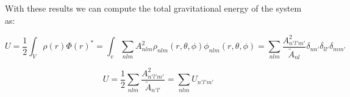 \documentclass[14pt]{article}
\begin{document}
With these results we can compute the total gravitational energy of the system
as:

\begin{equation}
  U = \dfrac{1}{2} \int_V \rho(r)\Phi(r)^{*} = \int_v  \sum_{nlm} A_{nlm}^2 \rho_{nlm}(r,
  \theta, \phi) \phi_{nlm}(r, \theta, \phi) = \sum_{nlm}
  \frac{A_{n'l'm'}^2}{\tilde{A}_{nl}}
  \delta_{nn'}\delta_{ll'}\delta_{mm'} 
\end{equation}

\begin{equation}
  U = \dfrac{1}{2}\sum_{nlm} \frac{A_{n'l'm'}^2}{\tilde{A}_{n'l'}} = \sum_{nlm} U_{n'l'm'}
\end{equation}
\end{document}
